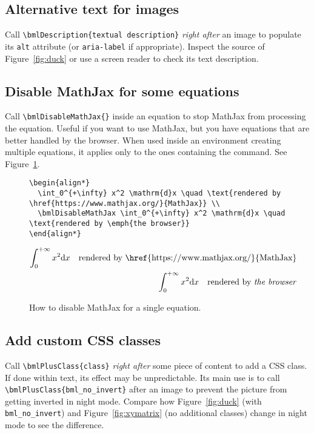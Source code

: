 \documentclass[a4paper,british]{article}
\def\ltxinline{\lstinline[style=bookml]}
\def\htmlinline{\lstinline[language=html]}
\begin{document}
\subsection{Alternative text for images}
Call \ltxinline|\bmlDescription{textual description}| \emph{right after} an image to populate its \htmlinline|alt| attribute (or \ltxinline|aria-label| if appropriate). Inspect the \HTML{} source of Figure~\ref{fig:duck} or use a screen reader to check its text description.

\subsection{Disable MathJax for some equations}
Call \ltxinline|\bmlDisableMathJax{}| inside an equation to stop MathJax from processing the equation. Useful if you want to use MathJax, but you have equations that are better handled by the browser. When used inside an environment creating multiple equations, it applies only to the ones containing the command. See Figure~\ref{fig:disable-mathjax}.

\begin{figure}
  \begin{lstlisting}[style=bookml]
\begin{align*}
  \int_0^{+\infty} x^2 \mathrm{d}x \quad \text{rendered by \href{https://www.mathjax.org/}{MathJax}} \\
  \bmlDisableMathJax \int_0^{+\infty} x^2 \mathrm{d}x \quad \text{rendered by \emph{the browser}}
\end{align*}
  \end{lstlisting}
  \begin{align*}
    \int_0^{+\infty} x^2 \mathrm{d}x \quad \text{rendered by \href{https://www.mathjax.org/}{MathJax}} \\
    \bmlDisableMathJax \int_0^{+\infty} x^2 \mathrm{d}x \quad \text{rendered by \emph{the browser}}
  \end{align*}
  \caption{How to disable MathJax for a single equation.}
  \label{fig:disable-mathjax}
\end{figure}

\subsection{Add custom CSS classes}
Call \ltxinline|\bmlPlusClass{class}| \emph{right after} some piece of content to add a CSS class. If done within text, its effect may be unpredictable. Its main use is to call \ltxinline|\bmlPlusClass{bml_no_invert}| after an image to prevent the picture from getting inverted in night mode. Compare how Figure~\ref{fig:duck} (with \ltxinline|bml_no_invert|) and Figure~\ref{fig:xymatrix} (no additional classes) change in night mode to see the difference.
\end{document}
